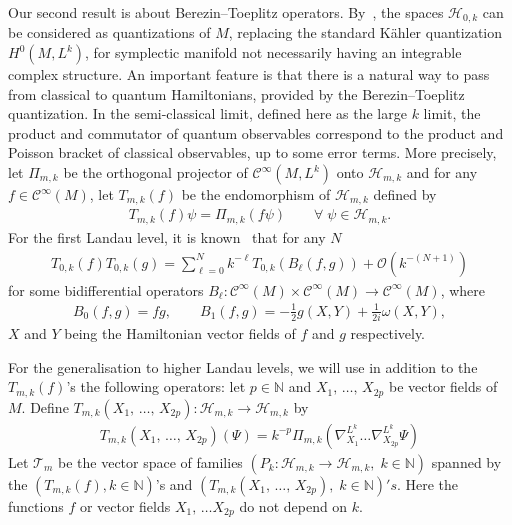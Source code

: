 \documentclass[10pt,a4paper]{article}
\theoremstyle{definition}
\numberwithin{equation}{section}
\newcommand{\N}{{\mathbb{N}}}
\newcommand{\om}{{\omega}}
\newcommand{\Ci}{{\mathcal{C}}^{\infty}}
\newcommand{\bigo}{\mathcal{O}}
\newcommand{\Hilb}{\mathcal{H}}
\newcommand{\clT}{\mathcal{T}}
\let\oldforall\forall
\renewcommand*{\forall}{\mathrel{\oldforall}}
\begin{document}
Our second result is about Berezin--Toeplitz operators. By~\cite{BoUr96}, the spaces $\Hilb_{0,k}$ can be considered as quantizations of $M$, replacing the standard K\"ahler quantization $H^0 (M,L^k)$, for symplectic manifold not necessarily having an integrable complex structure. An important feature is that there is a natural way to pass from classical to quantum Hamiltonians, provided by the Berezin--Toeplitz quantization. In the semi-classical limit, defined here as the large $k$ limit, the product and commutator of quantum observables correspond to the product and Poisson bracket of classical observables, up to some error terms. More precisely, let $\Pi_{m,k}$ be the orthogonal projector of $\Ci (M, L^k)$ onto $\Hilb_{m,k}$ and for any $f \in \Ci (M)$, let $T_{m,k} (f)$ be the endomorphism of $\Hilb_{m,k}$ defined by
\begin{gather}\label{eq:toeplitz}
T_{m,k} (f) \psi = \Pi_{m,k} (f \psi)
\qquad \forall \; \psi \in \Hilb_{m,k}.
\end{gather}
For the first Landau level, it is known~\cite{BoMeSc,oim_op,MaMa} that for any $N$
\begin{gather}\label{eq:t_0_k_produit_tout_ordre}
T_{0,k} (f) T_{0,k} (g) = \sum_{\ell = 0 } ^N k^{-\ell} T_{0,k} (B_\ell (f,g)) +
\bigo \left(k^{-(N+1)}\right)
\end{gather}
for some bidifferential operators $B_{\ell} : \Ci (M) \times \Ci (M)
\rightarrow \Ci (M)$, where
\begin{gather}\label{eq:b_0_b_1}
B_0 (f,g) = fg, \qquad B_1(f,g) = - \tfrac{1}{2} g(X,Y) + \tfrac{1}{2i} \om (X, Y),
\end{gather}
$X$ and $Y$ being the Hamiltonian vector fields of $f$ and $g$ respectively.


For the generalisation to higher Landau levels, we will use in addition to the $T_{m,k} (f)$'s the following operators: let $p \in \N$ and $X_1,\, \ldots,\, X_{2p}$ be vector fields of $M$. Define $ T_{m,k} (X_1,\, \ldots,\, X_{2p}):
\Hilb_{m,k} \rightarrow \Hilb_{m,k}$ by
\begin{gather}\label{eq:toep_der}
T_{m,k} (X_1, \,\ldots,\, X_{2p}) (\Psi) = k^{ -p} \Pi_{m,k} \left(\nabla^{L^k}_{X_1} \ldots
\nabla_{X_{2p}}^{L^k} \Psi\right)
\end{gather}
Let $\clT_m$ be the vector space of families $ (P_k : \Hilb_{m,k} \rightarrow
\Hilb_{m,k}, \; k \in \N)$ spanned by the $(T_{m,k} (f), k \in \N)$'s and $(T_{m,k} (X_1, \,\ldots,\, X_{2p}), \; k \in \N) 's$. Here the functions $f$ or vector fields $X_1,\,
\ldots X_{2p}$ do not depend on $k$.
\end{document}
